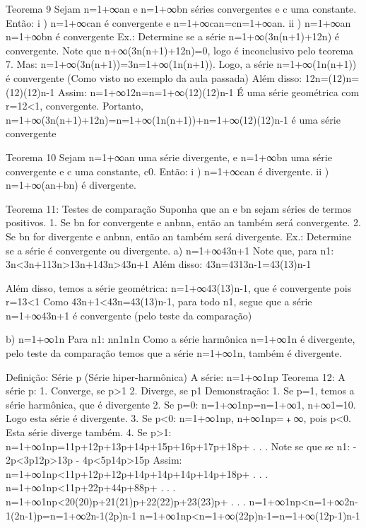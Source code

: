 Teorema 9
    Sejam n=1+∞an e n=1+∞bn séries convergentes e c uma constante. Então:
        i ) n=1+∞can é convergente e n=1+∞can=cn=1+∞an.
        ii ) n=1+∞an n=1+∞bn é convergente
        Ex.: Determine se a série n=1+∞(3n(n+1)+12n) é convergente.
            Note que n+∞(3n(n+1)+12n)=0, logo é inconclusivo pelo teorema 7.
            Mas: n=1+∞(3n(n+1))=3n=1+∞(1n(n+1)). Logo, a série n=1+∞(1n(n+1)) é convergente (Como visto no exemplo da aula passada)
            Além disso:
                12n=(12)n=(12)(12)n-1
            Assim:
                n=1+∞12n=n=1+∞(12)(12)n-1
            É uma série geométrica com r=12<1, convergente.
            Portanto, n=1+∞(3n(n+1)+12n)=n=1+∞(1n(n+1))+n=1+∞(12)(12)n-1 é uma série convergente

Teorema 10
    Sejam n=1+∞an uma série divergente, e n=1+∞bn uma série convergente e c uma constante, c0. Então:
        i ) n=1+∞can é divergente.
        ii ) n=1+∞(an+bn)  é divergente.

Teorema 11: Testes de comparação
    Suponha que an e bn sejam séries de termos positivos.
    1. Se bn for convergente e anbnn, então an também será convergente.
    2. Se bn for divergente e anbnn, então an também será divergente.
    Ex.: Determine se a série é convergente ou divergente.
        a) n=1+∞43n+1
            Note que, para n1:
                3n<3n+113n>13n+143n>43n+1
            Além disso: 
                43n=4313n-1=43(13)n-1


            Além disso, temos a série geométrica: 
                n=1+∞43(13)n-1, que é convergente pois r=13<1
            Como 43n+1<43n=43(13)n-1, para todo n1, segue que a série n=1+∞43n+1 é convergente (pelo teste da comparação)

        b) n=1+∞1n
            Para n1:
                nn1n1n
            Como a série harmônica n=1+∞1n é divergente, pelo teste da comparação temos que a série n=1+∞1n, também é divergente.

Definição: Série p (Série hiper-harmônica)
    A série:
        n=1+∞1np
    Teorema 12:
        A série p:
            1. Converge, se p>1
            2. Diverge, se p1
        Demonstração:
            1. Se p=1, temos a série harmônica, que é divergente
            2. Se p=0: n=1+∞1np=n=1+∞1, n+∞1=10. Logo esta série é divergente.
            3. Se p<0: n=1+∞1np, n+∞1np=﹢∞, pois p<0. Esta série diverge também.
            4. Se p>1: n=1+∞1np=11p+12p+13p+14p+15p+16p+17p+18p+ . . .
                Note se que se n1:
                    - 2p<3p12p>13p
                    - 4p<5p14p>15p
                Assim:
                    n=1+∞1np<11p+12p+12p+14p+14p+14p+14p+18p+ . . .
                    n=1+∞1np<11p+22p+44p+88p+ . . . n=1+∞1np<20(20)p+21(21)p+22(22)p+23(23)p+ . . . 
                    n=1+∞1np<n=1+∞2n-1(2n-1)p=n=1+∞2n-1(2p)n-1 
                    n=1+∞1np<n=1+∞(22p)n-1=n=1+∞(12p-1)n-1 

